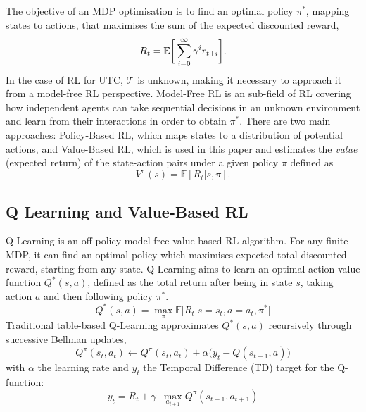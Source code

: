 \documentclass[a4paper, conference]{IEEEtran}
\begin{document}
The objective of an MDP optimisation is to find an optimal policy $\pi^*$, mapping states to actions, that maximises the sum of the expected discounted reward,
\begin{equation}
R_t = \mathbb{E} \bigg{[} \sum^{\infty}_{i=0} \gamma^i r_{t+i} \bigg{]} .
\label{eq:reward}
\end{equation}
In the case of RL for UTC, $\mathcal{T}$ is unknown, making it necessary to approach it from a model-free RL perspective.
Model-Free RL is an sub-field of RL covering how independent agents can take sequential decisions in an unknown environment and learn from their interactions in order to obtain $\pi^*$. 
There are two main approaches: Policy-Based RL, which maps states to a distribution of potential actions, and Value-Based RL, which is used in this paper and estimates the {\em value} (expected return) of the state-action pairs under a given policy $\pi$ defined  as
\begin{equation}
V^{\pi}(s) = \mathbb{E} [R_t|s,\pi].
\label{eq:value}
\end{equation}

\subsection{Q Learning and Value-Based RL}
Q-Learning\cite{watkins} is an off-policy model-free value-based RL algorithm. For any finite MDP, it can find an optimal policy which maximises expected total discounted reward, starting from any state\cite{melo}.
Q-Learning aims to learn an optimal action-value function $Q^*(s,a)$, defined as the total return after being in state $s$, taking action $a$ and then following policy $\pi^*$. %
\begin{equation}
Q^*(s,a) = \max_{\pi} \mathbb{E} \big[ R_t | s=s_t, a=a_t, \pi^* \big]
\label{eq:qlearning}
\end{equation}
Traditional table-based Q-Learning approximates $Q^*(s,a)$ recursively through successive Bellman updates,
\begin{equation}
Q^{\pi}(s_t,a_t) \leftarrow Q^{\pi}(s_t,a_t) + \alpha \big( y_t - Q(s_{t+1},a) \big)
\label{eq:bellmanupdate}
\end{equation}
with $\alpha$ the learning rate and $y_t$ the Temporal Difference (TD) target for the Q-function:
\begin{equation}
y_t = R_t + \gamma \,\,\, \max_{a_{t+1}} Q^{\pi}(s_{t+1},a_{t+1})
\end{equation}
\end{document}
